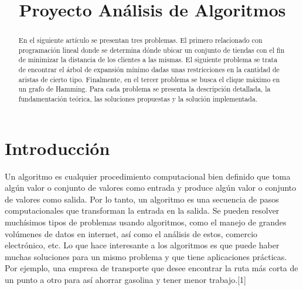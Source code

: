 \documentclass[conference,compsoc]{IEEEtran}
\begin{document}
%
\title{Proyecto Análisis de Algoritmos}


\author{
\and
{}
}
\maketitle

\begin{abstract}
En el siguiente artículo se presentan tres problemas. El primero relacionado con programación lineal donde se determina dónde ubicar un conjunto de tiendas con el fin de minimizar la distancia de los clientes a las mismas. El siguiente problema se trata de encontrar el árbol de expansión mínimo dadas unas restricciones en la cantidad de aristas de cierto tipo. Finalmente, en el tercer problema se busca el clique máximo en un grafo de Hamming. Para cada problema se presenta la descripción detallada, la fundamentación teórica, las soluciones propuestas y la solución implementada.
\end{abstract}

\IEEEpeerreviewmaketitle

\section{Introducción}
Un algoritmo es cualquier procedimiento computacional bien definido que toma algún valor o conjunto de valores como entrada y produce algún valor o conjunto de valores como salida. Por lo tanto, un algoritmo es una secuencia de pasos computacionales que transforman la entrada en la salida. Se pueden resolver muchísimos tipos de problemas usando algoritmos, como el manejo de grandes volúmenes de datos en internet, así como el análisis de estos, comercio electrónico, etc. Lo que hace interesante a los algoritmos es que puede haber muchas soluciones para un mismo problema y que tiene aplicaciones prácticas. Por ejemplo, una empresa de transporte que desee encontrar la ruta más corta de un punto a otro para así ahorrar gasolina y tener menor trabajo.[1]
\end{document}
